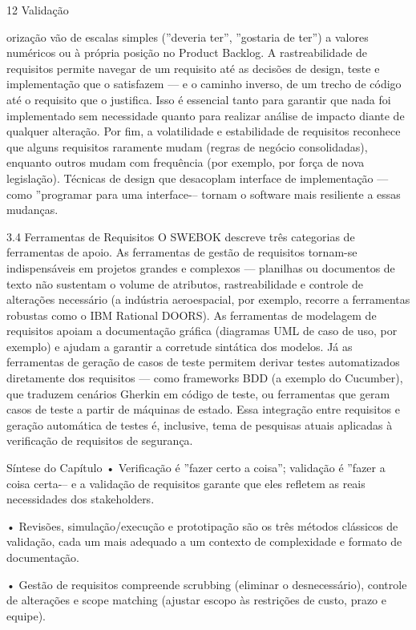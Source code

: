 12 Validação

orização vão de escalas simples (”deveria ter”, ”gostaria de ter”) a valores numéricos ou à própria posição no Product Backlog. A rastreabilidade de requisitos permite navegar de um requisito até as decisões de design, teste e implementação que o satisfazem — e o caminho inverso, de um trecho de código até o requisito que o justifica. Isso é essencial tanto para garantir que nada foi implementado sem necessidade quanto para realizar análise de impacto diante de qualquer alteração. Por fim, a volatilidade e estabilidade de requisitos reconhece que alguns requisitos raramente mudam (regras de negócio consolidadas), enquanto outros mudam com frequência (por exemplo, por força de nova legislação). Técnicas de design que desacoplam interface de implementação — como ”programar para uma interface-– tornam o software mais resiliente a essas mudanças.

3.4 Ferramentas de Requisitos O SWEBOK descreve três categorias de ferramentas de apoio. As ferramentas de gestão de requisitos tornam-se indispensáveis em projetos grandes e complexos — planilhas ou documentos de texto não sustentam o volume de atributos, rastreabilidade e controle de alterações necessário (a indústria aeroespacial, por exemplo, recorre a ferramentas robustas como o IBM Rational DOORS). As ferramentas de modelagem de requisitos apoiam a documentação gráfica (diagramas UML de caso de uso, por exemplo) e ajudam a garantir a corretude sintática dos modelos. Já as ferramentas de geração de casos de teste permitem derivar testes automatizados diretamente dos requisitos — como frameworks BDD (a exemplo do Cucumber), que traduzem cenários Gherkin em código de teste, ou ferramentas que geram casos de teste a partir de máquinas de estado. Essa integração entre requisitos e geração automática de testes é, inclusive, tema de pesquisas atuais aplicadas à verificação de requisitos de segurança.

Síntese do Capítulo • Verificação é ”fazer certo a coisa”; validação é ”fazer a coisa certa-– e a validação de requisitos garante que eles refletem as reais necessidades dos stakeholders.

• Revisões, simulação/execução e prototipação são os três métodos clássicos de validação, cada um mais adequado a um contexto de complexidade e formato de documentação.

• Gestão de requisitos compreende scrubbing (eliminar o desnecessário), controle de alterações e scope matching (ajustar escopo às restrições de custo, prazo e equipe).

